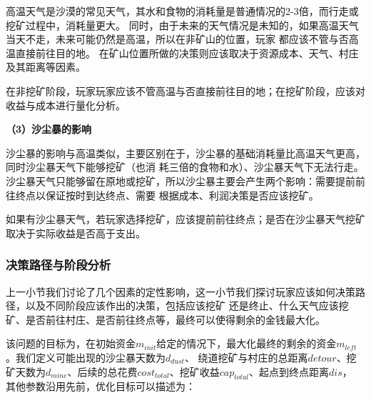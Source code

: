 \documentclass[bwprint]{cumcmthesis} %
\begin{document}
高温天气是沙漠的常见天气，其水和食物的消耗量是普通情况的2-3倍，而行走或挖矿过程中，消耗量更大。
同时，由于未来的天气情况是未知的，如果高温天气当天不走，未来可能仍然是高温，所以在非矿山的位置，玩家
都应该不管与否高温直接前往目的地。
在矿山位置所做的决策则应该取决于资源成本、天气、村庄及其距离等因素。


\begin{stratygy}
    在非挖矿阶段，玩家玩家应该不管高温与否直接前往目的地；在挖矿阶段，应该对收益与成本进行量化分析。
    \label{str:hot}
\end{stratygy}

\textbf{（3）沙尘暴的影响}

沙尘暴的影响与高温类似，主要区别在于，沙尘暴的基础消耗量比高温天气更高，同时沙尘暴天气下能够挖矿（也消
耗三倍的食物和水）、沙尘暴天气下无法行走。
沙尘暴天气只能够留在原地或挖矿，所以沙尘暴主要会产生两个影响：需要提前前往终点以保证按时到达终点、需要
根据成本、利润决策是否应该挖矿。

\begin{stratygy}
    如果有沙尘暴天气，若玩家选择挖矿，应该提前前往终点；是否在沙尘暴天气挖矿取决于实际收益是否高于支出。
    \label{str:dust}
\end{stratygy}

\subsubsection{决策路径与阶段分析}


上一小节我们讨论了几个因素的定性影响，这一小节我们探讨玩家应该如何决策路径，以及不同阶段应该作出的决策，包括应该挖矿
还是终止、什么天气应该挖矿、是否前往村庄、是否前往终点等，最终可以使得剩余的金钱最大化。

该问题的目标为，在初始资金$m_{init}$给定的情况下，最大化最终的剩余的资金$m_{left}$。我们定义可能出现的沙尘暴天数为$d_{dust}$、
绕道挖矿与村庄的总距离$detour$、挖矿天数为$d_{mine}$、后续的总花费$cost_{total}$、挖矿收益$cap_{total}$、起点到终点距离$dis$，
其他参数沿用先前，优化目标可以描述为：
\end{document}
